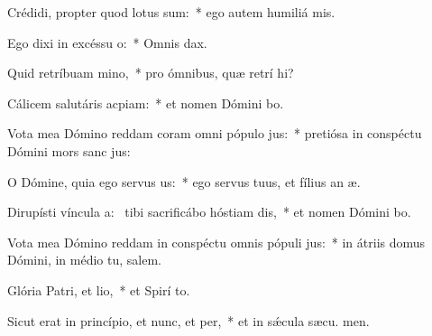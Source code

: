 \item Crédidi, propter quod lotus sum:~* ego autem humiliá  mis.
\item Ego dixi in excéssu o:~* Omnis  dax.
\item Quid retríbuam mino,~* pro ómnibus, quæ retrí hi?
\item Cálicem salutáris acpiam:~* et nomen Dómini bo.
\item Vota mea Dómino reddam coram omni pópulo jus:~* pretiósa in conspéctu Dómini mors sanc jus:
\item O Dómine, quia ego servus us:~* ego servus tuus, et fílius an æ.
\item Dirupísti víncula a:~\pscross{} tibi sacrificábo hóstiam dis,~* et nomen Dómini bo.
\item Vota mea Dómino reddam in conspéctu omnis pópuli jus:~* in átriis domus Dómini, in médio tu, salem.
\item Glória Patri, et lio,~* et Spirí to.
\item Sicut erat in princípio, et nunc, et per,~* et in sǽcula sæcu. men.
